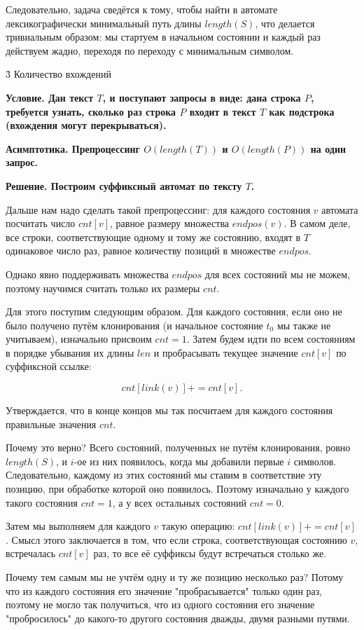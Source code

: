 Следовательно, задача сведётся к тому, чтобы найти в автомате лексикографически минимальный путь длины $length(S)$, что делается тривиальным образом: мы стартуем в начальном состоянии и каждый раз действуем жадно, переходя по переходу с минимальным символом.


\h3{ Количество вхождений }

\bf{Условие}. Дан текст $T$, и поступают запросы в виде: дана строка $P$, требуется узнать, сколько раз строка $P$ входит в текст $T$ как подстрока (вхождения могут перекрываться).

\bf{Асимптотика}. Препроцессинг $O (length (T))$ и $O (length (P))$ на один запрос.

\bf{Решение}. Построим суффиксный автомат по тексту $T$. 

Дальше нам надо сделать такой препроцессинг: для каждого состояния $v$ автомата посчитать число $cnt[v]$, равное размеру множества $endpos(v)$. В самом деле, все строки, соответствующие одному и тому же состоянию, входят в $T$ одинаковое число раз, равное количеству позиций в множестве $endpos$.

Однако явно поддерживать множества $endpos$ для всех состояний мы не можем, поэтому научимся считать только их размеры $cnt$.

Для этого поступим следующим образом. Для каждого состояния, если оно не было получено путём клонирования (и начальное состояние $t_0$ мы также не учитываем), изначально присвоим $cnt = 1$. Затем будем идти по всем состояниям в порядке убывания их длины $len$ и пробрасывать текущее значение $cnt[v]$ по суффиксной ссылке:

$$ cnt[link(v)] += cnt[v]. $$

Утверждается, что в конце концов мы так посчитаем для каждого состояния правильные значения $cnt$.

Почему это верно? Всего состояний, полученных не путём клонирования, ровно $length(S)$, и $i$-ое из них появилось, когда мы добавили первые $i$ символов. Следовательно, каждому из этих состояний мы ставим в соответствие эту позицию, при обработке которой оно появилось. Поэтому изначально у каждого такого состояния $cnt = 1$, а у всех остальных состояний $cnt = 0$.

Затем мы выполняем для каждого $v$ такую операцию: $cnt[link(v)] += cnt[v]$. Смысл этого заключается в том, что если строка, соответствующая состоянию $v$, встречалась $cnt[v]$ раз, то все её суффиксы будут встречаться столько же.

Почему тем самым мы не учтём одну и ту же позицию несколько раз? Потому что из каждого состояния его значение "пробрасывается" только один раз, поэтому не могло так получиться, что из одного состояния его значение "пробросилось" до какого-то другого состояния дважды, двумя разными путями.

